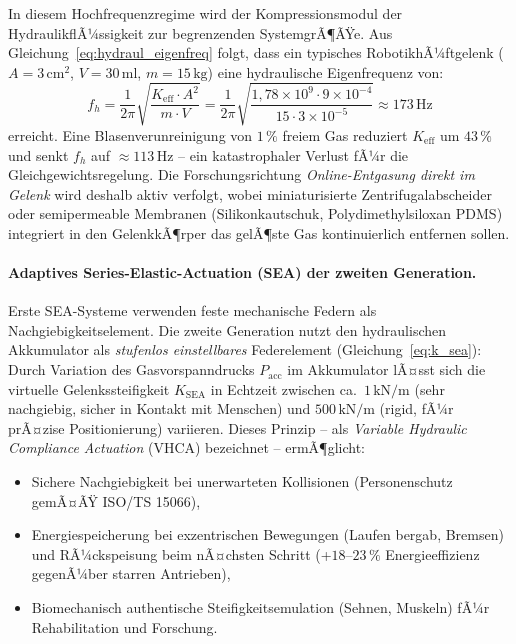 ﻿\documentclass[a4paper,12pt]{scrreprt}
\theoremstyle{definition}
\begin{document}
In diesem Hochfrequenzregime wird der Kompressionsmodul der Hydraulik\-flÃ¼ssigkeit
zur begrenzenden SystemgrÃ¶ÃŸe. Aus Gleichung~\eqref{eq:hydraul_eigenfreq}
folgt, dass ein typisches RobotikhÃ¼ftgelenk ($A = 3\,\mathrm{cm}^2$,
$V = 30\,\mathrm{ml}$, $m = 15\,\mathrm{kg}$) eine hydraulische
Eigenfrequenz von:
\begin{equation}
  f_h = \frac{1}{2\pi}\sqrt{\frac{K_{\mathrm{eff}} \cdot A^2}{m \cdot V}}
      = \frac{1}{2\pi}\sqrt{\frac{1{,}78 \times 10^9 \cdot 9 \times 10^{-4}}
        {15 \cdot 3 \times 10^{-5}}}
      \approx 173\,\mathrm{Hz}
  \label{eq:robotik_hueftgelenk}
\end{equation}
erreicht. Eine Blasenverunreinigung von $1\,\%$ freiem Gas reduziert
$K_{\mathrm{eff}}$ um $43\,\%$ und senkt $f_h$ auf $\approx 113\,\mathrm{Hz}$
-- ein katastrophaler Verlust fÃ¼r die Gleichgewichtsregelung. Die
Forschungsrichtung \emph{Online-Entgasung direkt im Gelenk} wird
deshalb aktiv verfolgt, wobei miniaturisierte Zentrifugalabscheider
oder semi\-permeable Membranen (Silikonkautschuk, Polydimethylsiloxan
PDMS) integriert in den GelenkkÃ¶rper das gelÃ¶ste Gas kontinuierlich
entfernen sollen.

\paragraph{Adaptives Series-Elastic-Actuation (SEA) der zweiten Generation.}
Erste SEA-Systeme verwenden feste mechanische Federn als Nachgiebigkeits\-element.
Die zweite Generation nutzt den hydraulischen Akkumulator als
\emph{stufenlos einstellbares} Federelement (Gleichung~\eqref{eq:k_sea}):
Durch Variation des Gasvorspanndrucks $P_{\mathrm{acc}}$ im Akkumulator
lÃ¤sst sich die virtuelle Gelenks\-steifigkeit $K_{\mathrm{SEA}}$ in Echtzeit
zwischen ca.\ $1\,\mathrm{kN/m}$ (sehr nachgiebig, sicher in
Kontakt mit Menschen) und $500\,\mathrm{kN/m}$ (rigid, fÃ¼r prÃ¤zise
Positionierung) variieren. Dieses Prinzip -- als \emph{Variable Hydraulic
Compliance Actuation} (VHCA) bezeichnet -- ermÃ¶glicht:
\begin{itemize}
  \item Sichere Nachgiebigkeit bei unerwarteten Kollisionen
    (Personenschutz gemÃ¤ÃŸ ISO/TS 15066),
  \item Energiespeicherung bei exzentrischen Bewegungen (Laufen bergab,
    Bremsen) und RÃ¼ckspeisung beim nÃ¤chsten Schritt (+$18$--$23\,\%$
    Energieeffizienz gegenÃ¼ber starren Antrieben),
  \item Biomechanisch authentische Steifigkeitsemulation (Sehnen,
    Muskeln) fÃ¼r Rehabilitation und Forschung.
\end{itemize}
\end{document}
